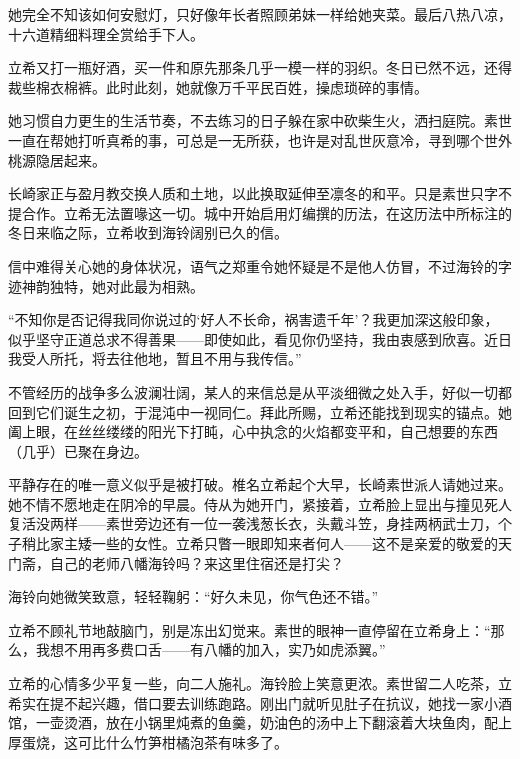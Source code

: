 \documentclass{article}
\begin{document}
她完全不知该如何安慰灯，只好像年长者照顾弟妹一样给她夹菜。最后八热八凉，十六道精细料理全赏给手下人。



立希又打一瓶好酒，买一件和原先那条几乎一模一样的羽织。冬日已然不远，还得裁些棉衣棉裤。此时此刻，她就像万千平民百姓，操虑琐碎的事情。



她习惯自力更生的生活节奏，不去练习的日子躲在家中砍柴生火，洒扫庭院。素世一直在帮她打听真希的事，可总是一无所获，也许是对乱世灰意冷，寻到哪个世外桃源隐居起来。



长崎家正与盈月教交换人质和土地，以此换取延伸至凛冬的和平。只是素世只字不提合作。立希无法置喙这一切。城中开始启用灯编撰的历法，在这历法中所标注的冬日来临之际，立希收到海铃阔别已久的信。



信中难得关心她的身体状况，语气之郑重令她怀疑是不是他人仿冒，不过海铃的字迹神韵独特，她对此最为相熟。



“不知你是否记得我同你说过的‘好人不长命，祸害遗千年’？我更加深这般印象，似乎坚守正道总求不得善果——即使如此，看见你仍坚持，我由衷感到欣喜。近日我受人所托，将去往他地，暂且不用与我传信。”



不管经历的战争多么波澜壮阔，某人的来信总是从平淡细微之处入手，好似一切都回到它们诞生之初，于混沌中一视同仁。拜此所赐，立希还能找到现实的锚点。她阖上眼，在丝丝缕缕的阳光下打盹，心中执念的火焰都变平和，自己想要的东西（几乎）已聚在身边。



平静存在的唯一意义似乎是被打破。椎名立希起个大早，长崎素世派人请她过来。她不情不愿地走在阴冷的早晨。侍从为她开门，紧接着，立希脸上显出与撞见死人复活没两样——素世旁边还有一位一袭浅葱长衣，头戴斗笠，身挂两柄武士刀，个子稍比家主矮一些的女性。立希只瞥一眼即知来者何人——这不是亲爱的敬爱的天门斋，自己的老师八幡海铃吗？来这里住宿还是打尖？



海铃向她微笑致意，轻轻鞠躬：“好久未见，你气色还不错。”



立希不顾礼节地敲脑门，别是冻出幻觉来。素世的眼神一直停留在立希身上：“那么，我想不用再多费口舌——有八幡的加入，实乃如虎添翼。”



立希的心情多少平复一些，向二人施礼。海铃脸上笑意更浓。素世留二人吃茶，立希实在提不起兴趣，借口要去训练跑路。刚出门就听见肚子在抗议，她找一家小酒馆，一壶烫酒，放在小锅里炖煮的鱼羹，奶油色的汤中上下翻滚着大块鱼肉，配上厚蛋烧，这可比什么竹笋柑橘泡茶有味多了。
\end{document}
